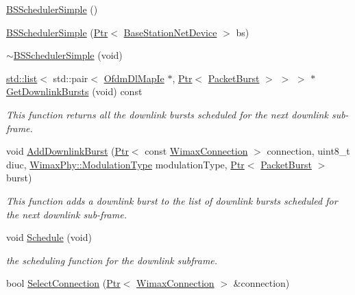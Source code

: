 \begin{DoxyCompactItemize}
\item 
\hyperlink{classns3_1_1BSSchedulerSimple_a650ac1a70cfe9750570623520e2c1a92}{B\+S\+Scheduler\+Simple} ()
\item 
\hyperlink{classns3_1_1BSSchedulerSimple_adb3766c5547ea55ce89466ad364a6f5b}{B\+S\+Scheduler\+Simple} (\hyperlink{classns3_1_1Ptr}{Ptr}$<$ \hyperlink{classns3_1_1BaseStationNetDevice}{Base\+Station\+Net\+Device} $>$ bs)
\item 
\hyperlink{classns3_1_1BSSchedulerSimple_a8fe8de541bdd321b563461da4ad99916}{$\sim$\+B\+S\+Scheduler\+Simple} (void)
\item 
\hyperlink{openflow-interface_8h_afd9bcfa176617760671b67580f536fa7}{std\+::list}$<$ std\+::pair$<$ \hyperlink{classns3_1_1OfdmDlMapIe}{Ofdm\+Dl\+Map\+Ie} $\ast$, \hyperlink{classns3_1_1Ptr}{Ptr}$<$ \hyperlink{classns3_1_1PacketBurst}{Packet\+Burst} $>$ $>$ $>$ $\ast$ \hyperlink{classns3_1_1BSSchedulerSimple_af96ec5d1f8de093aca004931d669eb77}{Get\+Downlink\+Bursts} (void) const 
\begin{DoxyCompactList}\small\item\em This function returns all the downlink bursts scheduled for the next downlink sub-\/frame. \end{DoxyCompactList}\item 
void \hyperlink{classns3_1_1BSSchedulerSimple_af79d1e83a763249efdb65d62173442cd}{Add\+Downlink\+Burst} (\hyperlink{classns3_1_1Ptr}{Ptr}$<$ const \hyperlink{classns3_1_1WimaxConnection}{Wimax\+Connection} $>$ connection, uint8\+\_\+t diuc, \hyperlink{classns3_1_1WimaxPhy_a044c5d8a48ca992c39c2a946f6e755fa}{Wimax\+Phy\+::\+Modulation\+Type} modulation\+Type, \hyperlink{classns3_1_1Ptr}{Ptr}$<$ \hyperlink{classns3_1_1PacketBurst}{Packet\+Burst} $>$ burst)
\begin{DoxyCompactList}\small\item\em This function adds a downlink burst to the list of downlink bursts scheduled for the next downlink sub-\/frame. \end{DoxyCompactList}\item 
void \hyperlink{classns3_1_1BSSchedulerSimple_ab0ef72a5223a70761910bcda7004f510}{Schedule} (void)
\begin{DoxyCompactList}\small\item\em the scheduling function for the downlink subframe. \end{DoxyCompactList}\item 
bool \hyperlink{classns3_1_1BSSchedulerSimple_a38af9d126b6028a3ab1be504feee1ccd}{Select\+Connection} (\hyperlink{classns3_1_1Ptr}{Ptr}$<$ \hyperlink{classns3_1_1WimaxConnection}{Wimax\+Connection} $>$ \&connection)

\end{DoxyCompactItemize}
